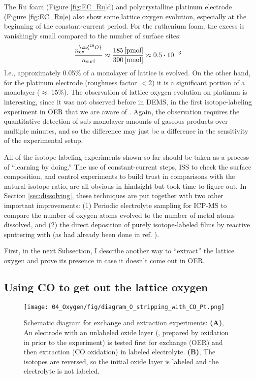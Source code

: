 The Ru foam (Figure \ref{fig:EC_Ru}d) and polycrystalline platinum electrode (Figure \ref{fig:EC_Ru}e) also show some lattice oxygen evolution, especially at the beginning of the constant-current period. For the ruthenium foam, the excess  is vanishingly small compared to the number of surface sites:
\begin{equation}
\frac{n^{\ch{^{18}O}}_{\text{ex}}}{n_{\text{surf}}}\approx\frac{185\,\text{[pmol]}}{300\,\text{[nmol]}}\approx 0.5 \cdot 10^{-3}
\end{equation}
I.e., approximately 0.05\% of a monolayer of lattice  is evolved. On the other hand, for the platinum electrode (roughness factor $<$2) it is a significant portion of a monolayer ($\approx$ 15\%). The observation of lattice oxygen evolution on platinum is interesting, since it was not observed before in DEMS, in the first isotope-labeling experiment in OER that we are aware of \cite{Willsau1985}. Again, the observation requires the quantitative detection of sub-monolayer amounts of gaseous products over multiple minutes, and so the difference may just be a difference in the sensitivity of the experimental setup.

All of the isotope-labeling experiments shown so far should be taken as a process of ``learning by doing.'' The use of constant-current steps, ISS to check the surface composition, and control experiments to build trust in comparisons with the natural isotope ratio, are all obvious in hindsight but took time to figure out. In Section \ref{sec:dissolving}, these techniques are put together with two other important improvements: (1) Periodic electrolyte sampling for ICP-MS to compare the number of oxygen atoms evolved to the number of metal atoms dissolved, and (2) the direct deposition of purely isotope-labeled films by reactive sputtering with  (as had already been done in ref. ). 

First, in the next Subsection, I describe another way to ``extract'' the lattice oxygen and prove its presence in case it doesn't come out in OER.


\subsection{Using CO to get out the lattice oxygen} \label{subsec:extraction}

\begin{figure}[h!]
	\centering
	\texttt{[image: 04\_Oxygen/fig/diagram\_O\_stripping\_with\_CO\_Pt.png]}
	\caption{
		Schematic diagram for exchange and extraction experiments: \textbf{(A)}, An electrode with an unlabeled oxide layer (, prepared by oxidation in  prior to the experiment) is tested first for exchange (OER) and then extraction (CO oxidation) in labeled electrolyte. \textbf{(B)}, The isotopes are reversed, so the initial oxide layer is labeled and the electrolyte is not labeled.
	}
	\label{fig:Pt_extraction_diagram}
\end{figure}

